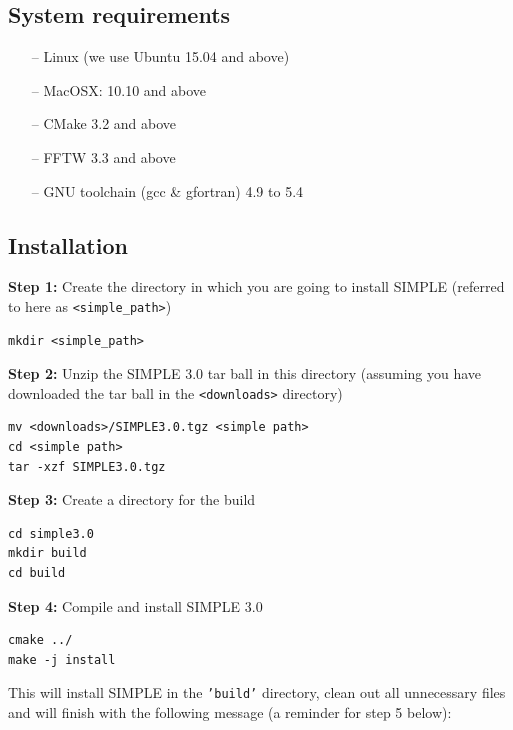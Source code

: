 \documentclass[a4paper,11pt]{article}
\begin{document}
\subsection{System requirements}
\begin{itemize}
	\item[--] Linux (we use Ubuntu 15.04 and above)
	\item[--] MacOSX: 10.10 and above
	\item[--] CMake 3.2 and above
	\item[--] FFTW 3.3 and above
	\item[--] GNU toolchain (gcc \& gfortran) 4.9 to 5.4
\end{itemize}

\subsection{Installation}
\noindent{}\textbf{Step 1:} Create the directory in which you are going to install SIMPLE (referred to here as \texttt{<simple\_path>})

\begin{Verbatim}[commandchars=+\[\],fontsize=\small,breaklines=true]
mkdir <simple_path>
\end{Verbatim}

\noindent{}\textbf{Step 2:} Unzip the SIMPLE 3.0 tar ball in this directory (assuming you have downloaded the tar ball in the \texttt{<downloads>} directory)

\begin{Verbatim}[commandchars=+\[\],fontsize=\small,breaklines=true]
mv <downloads>/SIMPLE3.0.tgz <simple path>
cd <simple path>
tar -xzf SIMPLE3.0.tgz
\end{Verbatim}

\noindent{}\textbf{Step 3:} Create a directory for the build

\begin{Verbatim}[commandchars=+\[\],fontsize=\small,breaklines=true]
cd simple3.0
mkdir build
cd build
\end{Verbatim}

\noindent{}\textbf{Step 4:} Compile and install SIMPLE 3.0

\begin{Verbatim}[commandchars=+\[\],fontsize=\small,breaklines=true]
cmake ../
make -j install
\end{Verbatim}

\noindent{}This will install SIMPLE in the \texttt{'build'} directory, clean out all unnecessary
files and will finish with the following message (a reminder for step 5 below):
\end{document}
